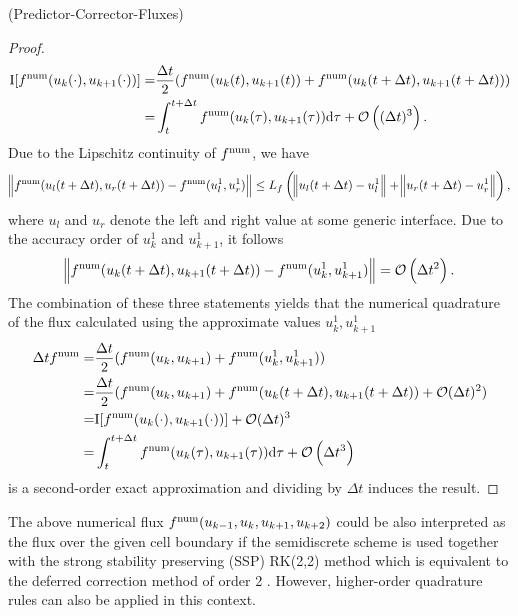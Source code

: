 \begin{theorem}{(Predictor-Corrector-Fluxes)}
\begin{proof}
		\[
		\begin{aligned}
		\mathrm{I}[f^{\mathrm{num}}(u_{k}(\cdot), u_{k+1}(\cdot))] = &\frac{\Delta t}{2}(f^{\mathrm{num}}(u_k(t), u_{k+1}(t)) + f^{\mathrm{num}}(u_{k}(t + \Delta t), u_{k+1}(t+ \Delta t))) \\ = &\int_t^{t + \Delta t} f^{\mathrm{num}}(u_{k}(\tau), u_{k+1}(\tau))\mathrm{d} \tau + \mathcal O\left((\Delta t)^3\right).
		\end{aligned}
		\]
		Due to the Lipschitz continuity of $f^{\mathrm{num}}$, we have 
		\[
		\norm{f^{\mathrm{num}}(u_l(t + \Delta t), u_r(t + \Delta t)) - f^{\mathrm{num}}(u^1_l, u^1_r)}\leq L_f \left(\norm {u_l(t + \Delta t) - u^1_l} + \norm{u_r(t + \Delta t) - u^1_r}\right),
		\]
		where $u_l$ and $u_r$ denote the left and right value at some generic interface. 
	Due to the accuracy order of $u^1_k$ and $u^1_{k+1}$, it follows
		\[
			\norm{f^{\mathrm{num}}(u_k(t + \Delta t), u_{k+1}(t + \Delta t)) - f^{\mathrm{num}}(u^1_k, u^1_{k+1})} = \mathcal O\left(\Delta t^2 \right).
		\]
		The combination of these three statements yields that the numerical quadrature of the flux calculated using the approximate values $u^1_k, u^1_{k+1}$
		\[
		\begin{aligned}
		\Delta t f^{\mathrm{num}} 	=& \frac{\Delta t }{2}(f^{\mathrm{num}}(u_{k}, u_{k+1}) + f^{\mathrm{num}}(u^1_k, u^1_{k+1})) \\
						=& \frac{\Delta t }{2}(f^{\mathrm{num}}(u_k, u_{k+1}) + f^{\mathrm{num}}(u_k(t + \Delta t), u_{k+1}(t + \Delta t)) + \mathcal O(\Delta t)^2) \\
						=& \mathrm{I}[f^{\mathrm{num}}(u_k(\cdot), u_{k+1}(\cdot))] + \mathcal O(\Delta t)^3 \\
						=& \int_t^{t + \Delta t} f^{\mathrm{num}}(u_k(\tau), u_{k+1}(\tau))\mathrm{d} \tau + \mathcal O\left(\Delta t^3\right) 
		\end{aligned}
		\]
		is a second-order exact approximation and dividing by $\Delta t$ induces the result.
		\end{proof}
\end{theorem}
The above numerical flux $f^{\mathrm{num}}(u_{k-1}, u_{k}, u_{k+1}, u_{k+2})$ could be also interpreted as the flux over the given cell boundary if the semidiscrete scheme is used together with the strong stability preserving (SSP) RK(2,2) method which is equivalent to the deferred correction method of order 2 \cite{abgrall2021relaxation}. However, higher-order quadrature rules can also be applied in this context. 
